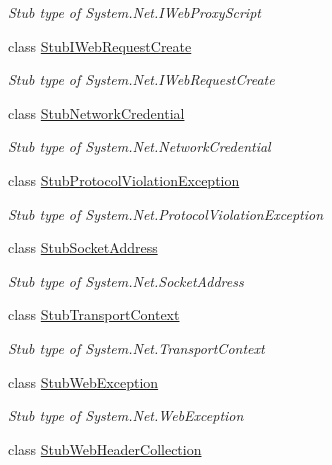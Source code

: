 \begin{DoxyCompactItemize}
\begin{DoxyCompactList}\small\item\em Stub type of System.\-Net.\-I\-Web\-Proxy\-Script\end{DoxyCompactList}\item 
class \hyperlink{class_system_1_1_net_1_1_fakes_1_1_stub_i_web_request_create}{Stub\-I\-Web\-Request\-Create}
\begin{DoxyCompactList}\small\item\em Stub type of System.\-Net.\-I\-Web\-Request\-Create\end{DoxyCompactList}\item 
class \hyperlink{class_system_1_1_net_1_1_fakes_1_1_stub_network_credential}{Stub\-Network\-Credential}
\begin{DoxyCompactList}\small\item\em Stub type of System.\-Net.\-Network\-Credential\end{DoxyCompactList}\item 
class \hyperlink{class_system_1_1_net_1_1_fakes_1_1_stub_protocol_violation_exception}{Stub\-Protocol\-Violation\-Exception}
\begin{DoxyCompactList}\small\item\em Stub type of System.\-Net.\-Protocol\-Violation\-Exception\end{DoxyCompactList}\item 
class \hyperlink{class_system_1_1_net_1_1_fakes_1_1_stub_socket_address}{Stub\-Socket\-Address}
\begin{DoxyCompactList}\small\item\em Stub type of System.\-Net.\-Socket\-Address\end{DoxyCompactList}\item 
class \hyperlink{class_system_1_1_net_1_1_fakes_1_1_stub_transport_context}{Stub\-Transport\-Context}
\begin{DoxyCompactList}\small\item\em Stub type of System.\-Net.\-Transport\-Context\end{DoxyCompactList}\item 
class \hyperlink{class_system_1_1_net_1_1_fakes_1_1_stub_web_exception}{Stub\-Web\-Exception}
\begin{DoxyCompactList}\small\item\em Stub type of System.\-Net.\-Web\-Exception\end{DoxyCompactList}\item 
class \hyperlink{class_system_1_1_net_1_1_fakes_1_1_stub_web_header_collection}{Stub\-Web\-Header\-Collection}

\end{DoxyCompactItemize}
